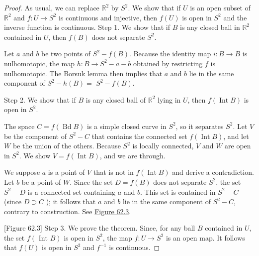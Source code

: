 \begin{proof}
As usual, we can replace \(\mathbb{R}^{2}\) by \(S^{2}\). We show that if \(U\) is an open subset of \(\mathbb{R}^{2}\) and \(f : U \rightarrow {S}^{2}\) is continuous and injective, then \(f( U)\) is open in \(S^{2}\) and the inverse function is continuous.
Step 1. We show that if \(B\) is any closed ball in \(\mathbb{R}^{2}\) contained in \(U\), then \(f( B)\) does not separate \(S^{2}\).

Let \(a\) and \(b\) be two points of \(S^{2} - f( B)\). Because the identity map \(i : B \rightarrow B\) is nulhomotopic, the map \(h : B \rightarrow {S}^{2} - a - b\) obtained by restricting \(f\) is nulhomotopic. The Borsuk lemma then implies that \(a\) and \(b\) lie in the same component of \(S^{2} - h( B) =\) \(S^{2} - f( B)\).

Step 2. We show that if \(B\) is any closed ball of \(\mathbb{R}^{2}\) lying in \(U\), then \(f( {\operatorname{Int}B})\) is open in \(S^{2}\).

The space \(C = f( {\operatorname{Bd}B})\) is a simple closed curve in \(S^{2}\), so it separates \(S^{2}\). Let \(V\) be the component of \(S^{2} - C\) that contains the connected set \(f( {\operatorname{Int}B})\), and let \(W\) be the union of the others. Because \(S^{2}\) is locally connected, \(V\) and \(W\) are open in \(S^{2}\). We show \(V = f( {\operatorname{Int}B})\), and we are through.

We suppose \(a\) is a point of \(V\) that is not in \(f( {\operatorname{Int}B})\) and derive a contradiction. Let \(b\) be a point of \(W\). Since the set \(D = f( B)\) does not separate \(S^{2}\), the set \(S^{2} - D\) is a connected set containing \(a\) and \(b\). This set is contained in \(S^{2} - C\) (since \(D \supset C\) ); it follows that \(a\) and \(b\) lie in the same component of \(S^{2} - C\), contrary to construction. See \hyperref[fig:62.3]{Figure 62.3}.

[Figure 62.3]
Step 3. We prove the theorem. Since, for any ball \(B\) contained in \(U\), the set \(f( {\text{ Int }B})\) is open in \(S^{2}\), the map \(f : U \rightarrow {S}^{2}\) is an open map. It follows that \(f( U)\) is open in \(S^{2}\) and \(f^{-1}\) is continuous.
\end{proof}
